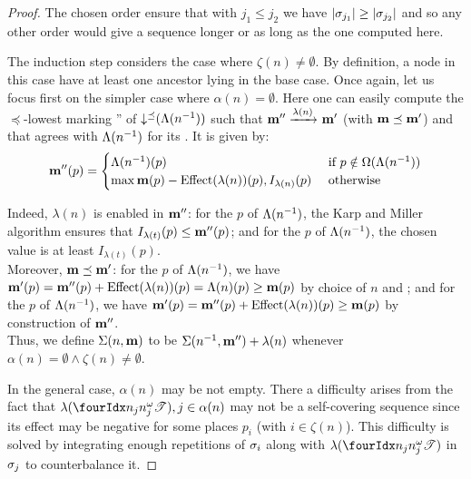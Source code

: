 \begin{proof}
  The chosen order ensure that with $j_1 \leq j_2$ we have $\card{\seqt_{j_1}} \geq \card{\seqt_{j_2}}$ and so any other order would give a sequence longer or as long as the one computed here.


  The induction step considers the case where $\zeta(n) \neq \emptyset$.
  By definition, a node in this case have at least one ancestor lying in the base case.
  Once again, let us focus first on the simpler case where $\alpha(n) = \emptyset$.
  Here one can easily compute the $\preceq$-lowest marking \mar'' of $\operatorname{\downarrow^\preceq}(\operatorname{\Lambda}(n^{-1}))$ such that $\mathbf{m}'' \xrightarrow{\lambda(n)}_{} \mathbf{m}'$ (with $\mathbf{m} \preceq \mathbf{m}'$) and that agrees with $\operatorname{\Lambda}(n^{-1})$ for its \noplaces. It is given by:
  \[
    \mar''(p) = \begin{cases}
      \lab{\parent{n}}(p)
        &\text{ if } p \notin \op{\lab{\parent{n}}} \\
      \max{\mar(p) - \effect{\lambda(n)}(p), I_{\lambda(n)}(p)}
        &\text{ otherwise}
    \end{cases}
  \]

  Indeed, %
  $\lambda(n)$ is enabled in $\mathbf{m}''$:
  for the \noplaces $p$ of $\operatorname{\Lambda}(n^{-1})$, the Karp and Miller algorithm ensures that $I_{\lambda(t)}(p) \leq \mathbf{m}''(p)$;
  and for the \oplaces $p$ of $\operatorname{\Lambda}(n^{-1})$, the chosen value is at least $I_{\lambda(t)}(p)$.\\
  Moreover, %
  $\mathbf{m} \preceq \mathbf{m}'$:
  for the \noplaces $p$ of $\operatorname{\Lambda}(n^{-1})$, we have $\mar'(p) = \mar''(p) + \effect{\lambda(n)}(p) = \lab{n}(p) \geq \mar(p)$ by choice of $n$ and \mar;
  and for the \oplaces $p$ of $\operatorname{\Lambda}(n^{-1})$, we have $\mar'(p) = \mar''(p) + \effect{\lambda(n)}(p) \geq \mar(p)$ by construction of $\mathbf{m}''$.\\
  Thus, we define
  $\Sigma(n, \mathbf{m})$ to be $\Sigma(n^{-1}, \mathbf{m}'') + \lambda(n)$
  whenever
  $\alpha(n) = \emptyset \wedge \zeta(n) \neq \emptyset$.

  In the general case, $\alpha(n)$ may be not empty.
  There a difficulty arises from the fact that $\lambda(\treepath[n_j]{n^\omega_j}), j \in \alpha(n)$ may not be a self-covering sequence since its effect may be negative for some places $p_i$ (with $i \in \zeta(n)$).
  This difficulty is solved by integrating enough repetitions of $\seqt_i$ along with $\lambda(\treepath[n_j]{n^\omega_j})$ in $\seqt_j$ to counterbalance it.


\end{proof}

